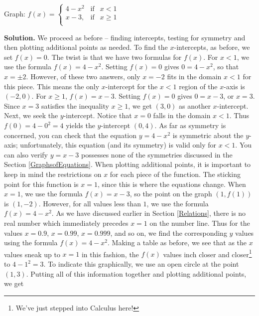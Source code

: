 \begin{ex} Graph:  $f(x) = \left\{ \begin{array}{rcl} 4-x^2 & \mbox{if} &  x < 1 \\ x - 3, & \mbox{if} & x \geq 1 \\ \end{array} \right.$

\medskip

{\bf Solution.}  We proceed as before -- finding intercepts, testing for symmetry and then plotting additional points as needed.  To find the $x$-intercepts, as before, we set $f(x)=0$.  The twist is that we have two formulas for $f(x)$.  For $x<1$, we use the formula $f(x) = 4-x^2$.  Setting $f(x) = 0$ gives $0 = 4 - x^2$, so that $x = \pm 2$.  However, of these two answers, only $x = -2$ fits in the domain $x < 1$ for this piece.  This means the only $x$-intercept for the $x < 1$ region of the $x$-axis is $(-2,0)$.  For $x \geq 1$, $f(x) = x-3$.  Setting $f(x) = 0$ gives  $0 = x-3$,  or $x=3$.  Since $x=3$ satisfies the inequality $x \geq 1$, we get $(3,0)$ as another $x$-intercept.  Next, we seek the $y$-intercept.  Notice that $x=0$ falls in the domain $x < 1$. Thus $f(0) = 4 - 0^2 = 4$ yields the $y$-intercept $(0,4)$.  As far as symmetry is concerned, you can check that the equation $y = 4 - x^2$ is symmetric about the $y$-axis;  unfortunately, this equation (and its symmetry) is valid only for $x < 1$.  You can also verify $y = x - 3$ possesses none of the symmetries discussed in the Section \ref{GraphsofEquations}. When plotting additional points, it is important to keep in mind the restrictions on $x$ for each piece of the function.  The sticking point for this function is $x=1$, since this is where the equations change.  When $x=1$, we use the formula $f(x) = x-3$, so the point on the graph $(1, f(1))$ is $(1,-2)$.  However, for all values less than $1$, we use the formula $f(x) = 4 - x^2$.  As we have discussed earlier in Section \ref{Relations}, there is no real number which immediately precedes $x=1$ on the number line.  Thus for the values $x = 0.9$, $x = 0.99$, $x=0.999$, and so on, we find the corresponding $y$ values using the formula $f(x) = 4 - x^2$.  Making a table as before, we see that as the $x$ values sneak up to $x=1$ in this fashion, the $f(x)$ values inch closer and closer\footnote{We've just stepped into Calculus here!} to $4 - 1^2 = 3$.  To indicate this graphically, we use an open circle at the point $(1,3)$.  Putting all of this information together and plotting additional points, we get


\end{ex}
